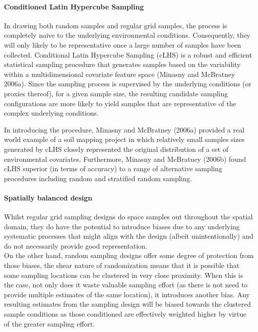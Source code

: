 \documentclass[a4paper]{article}
\begin{document}
\hypertarget{conditioned-latin-hypercube-sampling}{%
\paragraph{Conditioned Latin Hypercube
Sampling}\label{conditioned-latin-hypercube-sampling}}

In drawing both random samples and regular grid samples, the process is
completely naive to the underlying environmental conditions.
Consequently, they will only likely to be representative once a large
number of samples have been collected. Conditional Latin Hypercube
Sampling (cLHS) is a robust and efficient statistical sampling procedure
that generates samples based on the variability within a
multidimensional covariate feature space (Minasny and McBratney 2006a).
Since the sampling process is supervised by the underlying conditions
(or proxies thereof), for a given sample size, the resulting candidate
sampling configurations are more likely to yield samples that are
representative of the complex underlying conditions.

In introducing the procedure, Minasny and McBratney (2006a) provided a
real world example of a soil mapping project in which relatively small
samples sizes generated by cLHS closely represented the original
distribution of a set of environmental covariates. Furthermore, Minasny
and McBratney (2006b) found cLHS superior (in terms of accuracy) to a
range of alternative sampling procedures including random and stratified
random sampling.

\hypertarget{spatially-balanced-design}{%
\paragraph{Spatially balanced design}\label{spatially-balanced-design}}

Whilst regular grid sampling designs do space samples out throughout the
spatial domain, they do have the potential to introduce biases due to
any underlying systematic processes that might align with the design
(albeit unintentionally) and do not necessarily provide good
representation.\\
On the other hand, random sampling designs offer some degree of
protection from those biases, the shear nature of randomization means
that it is possible that some sampling locations can be clustered in
very close proximity. When this is the case, not only does it waste
valuable sampling effort (as there is not need to provide multiple
estimates of the same location), it introduces another bias. Any
resulting estimates from the sampling design will be biased towards the
clustered sample conditions as those conditioned are effectively
weighted higher by virtue of the greater sampling effort.
\end{document}
